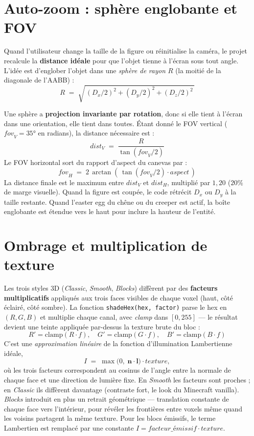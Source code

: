 \documentclass[12pt,a4paper]{scrartcl}
\newcommand{\code}[1]{\texttt{\small #1}}
\newcommand{\acc}[1]{\textcolor{accent}{\textbf{#1}}}
\begin{document}
\section{Auto-zoom : sphère englobante et FOV}

Quand l'utilisateur change la taille de la figure ou réinitialise la caméra, le projet recalcule la \acc{distance idéale} pour que l'objet tienne à l'écran sous tout angle. L'idée est d'englober l'objet dans une \emph{sphère de rayon $R$} (la moitié de la diagonale de l'AABB) :
\[
R \;=\; \sqrt{\,(D_x/2)^2 + (D_y/2)^2 + (D_z/2)^2\,}
\]

Une sphère a \acc{projection invariante par rotation}, donc si elle tient à l'écran dans une orientation, elle tient dans toutes. Étant donné le FOV vertical ($\mathit{fov}_V = 35°$ en radians), la distance nécessaire est :
\[
\mathit{dist}_V \;=\; \dfrac{R}{\tan(\mathit{fov}_V / 2)}
\]
Le FOV horizontal sort du rapport d'aspect du canevas par :
\[
\mathit{fov}_H \;=\; 2\,\arctan\!\left(\,\tan(\mathit{fov}_V/2)\cdot \mathit{aspect}\,\right)
\]
La distance finale est le maximum entre $\mathit{dist}_V$ et $\mathit{dist}_H$, multiplié par $1{,}20$ ($20\%$ de marge visuelle). Quand la figure est coupée, le code rétrécit $D_x$ ou $D_y$ à la taille restante. Quand l'easter egg du chêne ou du creeper est actif, la boîte englobante est étendue vers le haut pour inclure la hauteur de l'entité.

\section{Ombrage et multiplication de texture}

Les trois styles 3D (\emph{Classic}, \emph{Smooth}, \emph{Blocks}) diffèrent par des \acc{facteurs multiplicatifs} appliqués aux trois faces visibles de chaque voxel (haut, côté éclairé, côté sombre). La fonction \code{shadeHex(hex, factor)} parse le hex en $(R,G,B)$ et multiplie chaque canal, avec \emph{clamp} dans $[0, 255]$ --- le résultat devient une teinte appliquée par-dessus la texture brute du bloc :
\[
R' = \mathrm{clamp}(R \cdot f),\quad
G' = \mathrm{clamp}(G \cdot f),\quad
B' = \mathrm{clamp}(B \cdot f)
\]
C'est une \emph{approximation linéaire} de la fonction d'illumination Lambertienne idéale,
\[
I \;=\; \max\bigl(0,\;\mathbf{n}\cdot\mathbf{l}\bigr)\cdot \mathit{texture},
\]
où les trois facteurs correspondent au cosinus de l'angle entre la normale de chaque face et une direction de lumière fixe. En \emph{Smooth} les facteurs sont proches ; en \emph{Classic} ils diffèrent davantage (contraste fort, le look du Minecraft vanilla). \emph{Blocks} introduit en plus un retrait géométrique --- translation constante de chaque face vers l'intérieur, pour révéler les frontières entre voxels même quand les voisins partagent la même texture. Pour les blocs émissifs, le terme Lambertien est remplacé par une constante $I = \mathit{facteur\_émissif} \cdot \mathit{texture}$.
\end{document}
